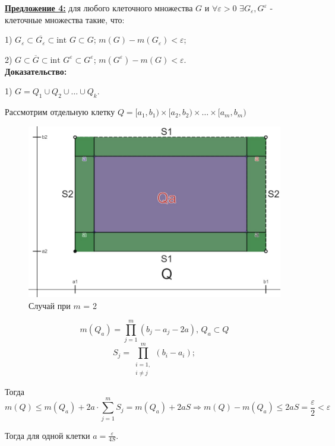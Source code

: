 \documentclass[a4paper,12pt]{article} %
\begin{document}
\underline{\textbf{Предложение 4:}} для любого клеточного множества $G$ и $\forall \varepsilon > 0$ $\exists G_{\varepsilon}, G^{\varepsilon}$ - клеточные множества такие, что:

1) $G_{\varepsilon} \subset \overline{G_{\varepsilon}} \subset \text{int } G \subset G$;\hspace{8mm} $m(G) - m(G_{\varepsilon}) < \varepsilon$;

2) $G \subset \overline{G} \subset \text{int } G^{\varepsilon} \subset G^{\varepsilon}$; \hspace{7mm} $m(G^{\varepsilon}) - m(G) < \varepsilon$.\\

\textbf{Доказательство:}

1) $G = Q_1 \cup Q_2 \cup \ldots \cup Q_k$.

Рассмотрим отдельную клетку $Q = [a_1, b_1) \times [a_2, b_2) \times \ldots \times [a_m, b_m)$

\begin{figure}[h!]
	\centering
	\includegraphics[scale=0.3]{Пред4.jpg}
	\caption{Случай при $m$ = 2}
\end{figure}

\[m(Q_a) = \prod\limits_{j = 1}^m (b_j - a_j - 2a) \text{, }  Q_a \subset Q \]
\[S_j = \prod\limits_{\substack{i = 1,\\ i \neq j}}^m (b_i - a_i);\]

Тогда
\[m(Q) \leqslant m(Q_a) + 2a\cdot\sum\limits_{j = 1}^m S_j = m(Q_a) + 2aS \Rightarrow m(Q) - m(Q_a) \leqslant 2aS = \frac{\varepsilon}{2} < \varepsilon \]

Тогда для одной клетки $a = \frac{\varepsilon}{4S}$.
\end{document}
